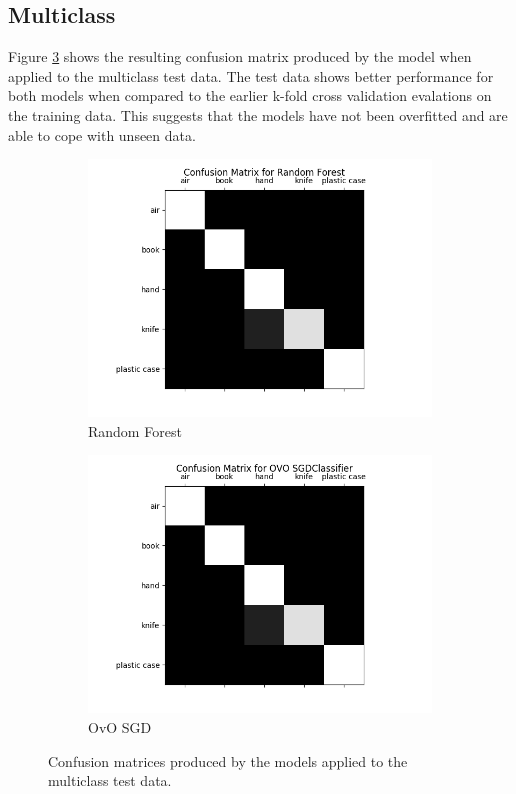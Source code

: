 \documentclass[12pt]{article}
\begin{document}
\subsection{Multiclass}

Figure \ref{fig:testmulticlass} shows the resulting confusion matrix produced by the model when applied to the multiclass test data. The test data shows better performance for both models when compared to the earlier k-fold cross validation evalations on the training data. This suggests that the models have not been overfitted and are able to cope with unseen data. 

\begin{figure}[!ht]
\centering
\begin{subfigure}{.5\textwidth}
  \centering
  \includegraphics[width=\linewidth]{images/mctestrf}
	\caption{Random Forest}
  \label{fig:mcrf}
\end{subfigure}%
\begin{subfigure}{.5\textwidth}
  \centering
  \includegraphics[width=\linewidth]{images/mctestsgd}
  \caption{OvO SGD}
  \label{fig:mcsgd}
\end{subfigure}
\caption{Confusion matrices produced by the models applied to the multiclass test data.}
\label{fig:testmulticlass}
\end{figure}
\end{document}
